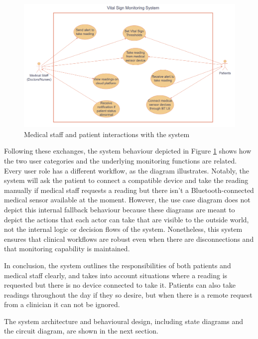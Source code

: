\begin{figure}[H]
	\centering
	\includegraphics[width=\textwidth]{diagrams/use_case_diagram}
	\caption{Medical staff and patient interactions with the system}
	\label{fig:use_case_diagram}
\end{figure}

Following these exchanges, the system behaviour depicted in Figure \ref{fig:use_case_diagram} shows how the two user categories and the underlying monitoring functions are related. Every user role has a different workflow, as the diagram illustrates. Notably, the system will ask the patient to connect a compatible device and take the reading manually if medical staff requests a reading but there isn't a Bluetooth-connected medical sensor available at the moment. However, the use case diagram does not depict this internal fallback behaviour because these diagrams are meant to depict the actions that each actor can take that are visible to the outside world, not the internal logic or decision flows of the system. Nonetheless, this system ensures that clinical workflows are robust even when there are disconnections and that monitoring capability is maintained.

In conclusion, the system outlines the responsibilities of both patients and medical staff clearly, and takes into account situations where a reading is requested but there is no device connected to take it. Patients can also take readings throughout the day if they so desire, but when there is a remote request from a clinician it can not be ignored.

The system architecture and behavioural design, including state diagrams and the circuit diagram, are shown in the next section.

